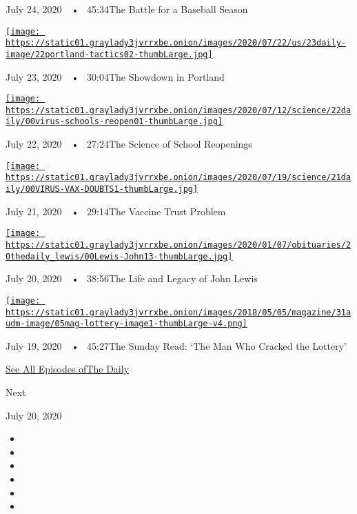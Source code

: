 July 24, 2020~~•~ 45:34The Battle for a Baseball Season

\href{https://www.nytimes3xbfgragh.onion/2020/07/23/podcasts/the-daily/portland-protests.html?action=click\&module=audio-series-bar\&region=header\&pgtype=Article}{\texttt{[image: https://static01.graylady3jvrrxbe.onion/images/2020/07/22/us/23daily-image/22portland-tactics02-thumbLarge.jpg]}}

July 23, 2020~~•~ 30:04The Showdown in Portland

\href{https://www.nytimes3xbfgragh.onion/2020/07/22/podcasts/the-daily/school-reopenings-coronavirus.html?action=click\&module=audio-series-bar\&region=header\&pgtype=Article}{\texttt{[image: https://static01.graylady3jvrrxbe.onion/images/2020/07/12/science/22daily/00virus-schools-reopen01-thumbLarge.jpg]}}

July 22, 2020~~•~ 27:24The Science of School Reopenings

\href{https://www.nytimes3xbfgragh.onion/2020/07/21/podcasts/the-daily/coronavirus-vaccine.html?action=click\&module=audio-series-bar\&region=header\&pgtype=Article}{\texttt{[image: https://static01.graylady3jvrrxbe.onion/images/2020/07/19/science/21daily/00VIRUS-VAX-DOUBTS1-thumbLarge.jpg]}}

July 21, 2020~~•~ 29:14The Vaccine Trust Problem

\href{https://www.nytimes3xbfgragh.onion/2020/07/20/podcasts/the-daily/john-lewis.html?action=click\&module=audio-series-bar\&region=header\&pgtype=Article}{\texttt{[image: https://static01.graylady3jvrrxbe.onion/images/2020/01/07/obituaries/20thedaily\_lewis/00Lewis-John13-thumbLarge.jpg]}}

July 20, 2020~~•~ 38:56The Life and Legacy of John Lewis

\href{https://www.nytimes3xbfgragh.onion/2020/07/19/podcasts/the-daily/lottery-winner-scam.html?action=click\&module=audio-series-bar\&region=header\&pgtype=Article}{\texttt{[image: https://static01.graylady3jvrrxbe.onion/images/2018/05/05/magazine/31audm-image/05mag-lottery-image1-thumbLarge-v4.png]}}

July 19, 2020~~•~ 45:27The Sunday Read: `The Man Who Cracked the
Lottery'

\href{https://www.nytimes3xbfgragh.onion/column/the-daily}{See All
Episodes ofThe Daily}

Next

July 20, 2020

\begin{itemize}
\item
\item
\item
\item
\item
\item
\end{itemize}

